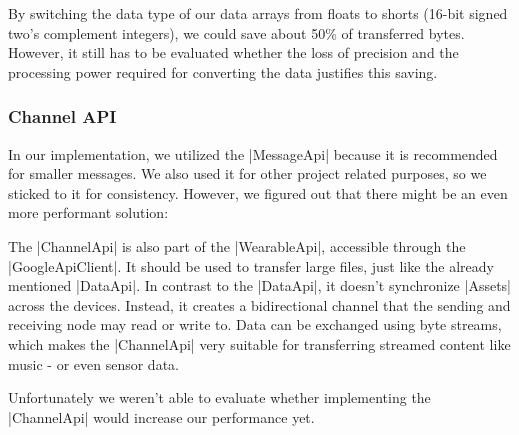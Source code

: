 By switching the data type of our data arrays from floats to shorts (16-bit signed two's complement integers), we could save about 50\% of transferred bytes. However, it still has to be evaluated whether the loss of precision and the processing power required for converting the data justifies this saving.

\subsubsection{Channel API}
In our implementation, we utilized the |MessageApi|\cite{androiddocs:messageapi} because it is recommended for smaller messages.
We also used it for other project related purposes, so we sticked to it for consistency.
However, we figured out that there might be an even more performant solution:

The |ChannelApi|\cite{androiddocs:channelapi} is also part of the |WearableApi|\cite{androiddocs:wearable}, accessible through the |GoogleApiClient|\cite{androiddocs:googleapiclient}.
It should be used to transfer large files, just like the already mentioned |DataApi|\cite{androiddocs:dataapi}.
In contrast to the |DataApi|, it doesn't synchronize |Assets|\cite{androiddocs:asset} across the devices.
Instead, it creates a bidirectional channel that the sending and receiving node may read or write to.
Data can be exchanged using byte streams, which makes the |ChannelApi| very suitable for transferring streamed content like music - or even sensor data.

Unfortunately we weren't able to evaluate whether implementing the |ChannelApi| would increase our performance yet.

\clearpage